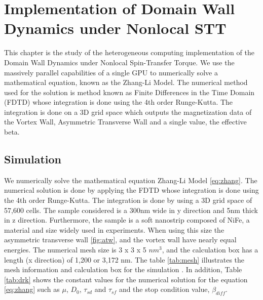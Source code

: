 
\chapter{Implementation of Domain Wall Dynamics under Nonlocal STT} %

\label{Implementation of Domain Wall Dynamics under Nonlocal STT} %


This chapter is the study of the heterogeneous computing implementation of the Domain Wall Dynamics under Nonlocal Spin-Transfer Torque. We use the massively parallel capabilities of a single GPU to numerically solve a mathematical equation, known as the Zhang-Li Model. The numerical method used for the solution is method known as Finite Differences in the Time Domain (FDTD) whose integration is done using the 4th order Runge-Kutta. The integration is done on a 3D grid space which outputs the magnetization data of the Vortex Wall, Asymmetric Transverse Wall and a single value, the effective beta.

\section{Simulation}

We numerically solve the mathematical equation Zhang-Li Model \ref{eq:zhang}. The numerical solution is done by applying the FDTD whose integration is done using the 4th order Runge-Kutta. The integration is done by using a 3D grid space of 57,600 cells. The sample considered is a 300nm wide in y direction and 5nm thick in z direction. Furthermore, the sample is a soft nanostrip composed of NiFe, a material and size widely used in experiments. When using this size the asymmetric transverse wall \ref{fig:atw}, and the vortex wall have nearly equal energies. The numerical mesh size is 3 x 3 x 5 $nm^3$, and the calculation box has a length (x direction) of 1,200 or 3,172 nm. The table \ref{tab:mesh} illustrates the mesh information and calculation box for the simulation \cite{claudio}. In addition, Table \ref{tab:drk} shows the constant values for the numerical solution for the equation \ref{eq:zhang} such as $\mu$, $D_{0}$, $\tau_{sd}$ and $\tau_{sf}$ and the stop condition value, $\beta_{diff}$.

